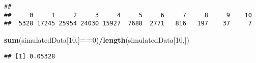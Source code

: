 \documentclass[
]{article}
\newenvironment{Shaded}{\begin{snugshade}}{\end{snugshade}}
\newcommand{\DecValTok}[1]{\textcolor[rgb]{0.00,0.00,0.81}{#1}}
\newcommand{\FunctionTok}[1]{\textcolor[rgb]{0.13,0.29,0.53}{\textbf{#1}}}
\newcommand{\NormalTok}[1]{#1}
\newcommand{\SpecialCharTok}[1]{\textcolor[rgb]{0.81,0.36,0.00}{\textbf{#1}}}
\begin{document}
\begin{verbatim}
## 
##     0     1     2     3     4     5     6     7     8     9    10 
##  5328 17245 25954 24030 15927  7688  2771   816   197    37     7
\end{verbatim}

\begin{Shaded}
\begin{Highlighting}[]
\FunctionTok{sum}\NormalTok{(simulatedData[}\DecValTok{10}\NormalTok{,]}\SpecialCharTok{==}\DecValTok{0}\NormalTok{)}\SpecialCharTok{/}\FunctionTok{length}\NormalTok{(simulatedData[}\DecValTok{10}\NormalTok{,])}
\end{Highlighting}
\end{Shaded}

\begin{verbatim}
## [1] 0.05328
\end{verbatim}
\end{document}
